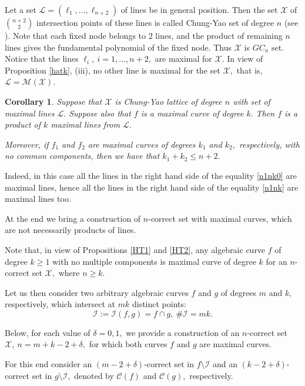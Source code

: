 \documentclass[a4paper,12pt]{article}
\newtheorem{corollary}[lemma]{Corollary}
\theoremstyle{definition}
\numberwithin{equation}{section}
\numberwithin{figure}{section}
\newcommand{\Cset}{\mathcal{C}}
\newcommand{\Iset}{\mathcal{I}}
\newcommand{\Lset}{\mathcal{L}}
\newcommand{\Mset}{\mathcal{M}}
\newcommand{\Xset}{\mathcal{X}}
\begin{document}
Let a set $\Lset=(\ell_1,\ldots,\ell_{n+2})$ of lines be in general position.
Then the set $\Xset$ of ${n+2\choose 2}$ intersection points
of these lines is called Chung-Yao set of degree $n$ (see \cite{HV}). Note that each fixed node belongs to $2$ lines, and the product of remaining $n$ lines gives the fundamental
polynomial of the fixed node. Thus $\Xset$ is $GC_n$ set. Notice that the lines $\ell_i,\ i=1,\ldots,n+2,$ are maximal for $\Xset.$ In view of Proposition \ref{hatk}, (iii), no other line is maximal for the set $\Xset,$ that is, $\Lset=\Mset(\Xset).$

\begin{corollary} 
Suppose that $\Xset$ is Chung-Yao lattice of degree $n$ with set of maximal lines $\Lset.$ Suppose also that $f$ is a maximal curve of degree $k.$ Then $f$ is a product of $k$ maximal lines from $\Lset.$ 

Moreover, if $f_1$ and $f_2$ are maximal curves of degrees $k_1$ and $k_2,$ respectively, with no common components, then we have that $k_1+k_2\le n+2.$
\end{corollary}
Indeed, in this case all the lines in the right hand side of the equality \eqref{n1nk0} are maximal lines, hence all the lines in the right hand side of the equality \eqref{n1nk} are maximal lines too.

At the end we bring a construction of $n$-correct set with maximal curves, which are not necessarily products of lines. 

Note that, in view of Propositions \ref{HT1} and \ref{HT2}, any algebraic curve $f$ of degree $k\ge 1$ with no multiple components is maximal curve of degree $k$ for an $n$-correct set $\Xset,$ where $n\ge k.$

Let us then consider two arbitrary algebraic curves $f$ and $g$ of degrees $m$ and $k,$ respectively, which intersect at $mk$ distinct points:
$$
\Iset:=\Iset(f,g)=f\cap g, \ \#\Iset=mk. 
$$

Below, for each value of $\delta=0, 1,$ we provide a construction of an $n$-correct set $\Xset,\ n=m+k-2+\delta,$ for which both curves $f$ and $g$ are maximal curves.

For this end consider  an $(m-2+\delta)$-correct set in $f\setminus\Iset$ and
an $(k-2+\delta)$-correct set in $g\setminus\Iset,$ denoted by $\Cset(f)$ and $\Cset(g),$ respectively.
\end{document}
